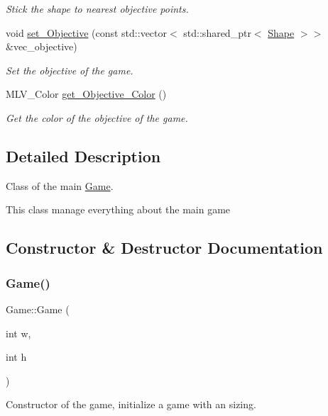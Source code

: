 \begin{DoxyCompactItemize}
\begin{DoxyCompactList}\small\item\em Stick the shape to nearest objective points. \end{DoxyCompactList}\item 
void \hyperlink{classGame_af8d3ef359625e4179d54f5dd956a0df5}{set\+\_\+\+Objective} (const std\+::vector$<$ std\+::shared\+\_\+ptr$<$ \hyperlink{classShape}{Shape} $>$$>$ \&vec\+\_\+objective)
\begin{DoxyCompactList}\small\item\em Set the objective of the game. \end{DoxyCompactList}\item 
M\+L\+V\+\_\+\+Color \hyperlink{classGame_ac5de4b11ae90a7ea9182621039fa511c}{get\+\_\+\+Objective\+\_\+\+Color} ()
\begin{DoxyCompactList}\small\item\em Get the color of the objective of the game. \end{DoxyCompactList}\end{DoxyCompactItemize}


\subsection{Detailed Description}
Class of the main \hyperlink{classGame}{Game}. 

This class manage everything about the main game 

\subsection{Constructor \& Destructor Documentation}
\mbox{\label{classGame_a2b0cb8af7b823a6d595eef9c9641f806}} 
\subsubsection{\texorpdfstring{Game()}{Game()}}
{\footnotesize\ttfamily Game\+::\+Game (\begin{DoxyParamCaption}\item[{int}]{w,  }\item[{int}]{h }\end{DoxyParamCaption})}



Constructor of the game, initialize a game with an sizing. 


